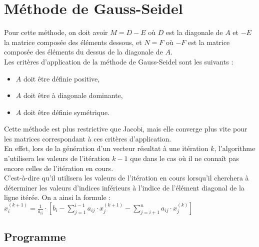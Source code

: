 \documentclass{report}
\begin{document}
  	\section{Méthode de Gauss-Seidel}
  	Pour cette méthode, on doit avoir $M=D-E$ où $D$ est la diagonale de $A$ et $-E$ la matrice composée des éléments dessous, et $N=F$ où $-F$ est la matrice composée des éléments du dessus de la diagonale de $A$.\\
      Les critères d'application de la méthode de Gauss-Seidel sont les suivants :
      \begin{itemize}
        \item{$A$ doit être définie positive,}
        \item{$A$ doit être à diagonale dominante,}
        \item{$A$ doit être définie symétrique.}
      \end{itemize}
      Cette méthode est plus restrictive que Jacobi, mais elle converge plus vite pour les matrices correspondant à ces critères d'application.\\
      
      En effet, lors de la génération d'un vecteur résultat à une itération $k$, l'algorithme n'utilisera les valeurs de l'itération $k-1$ que dans le cas où il ne connaît pas encore celles de l'itération en cours. \\
      
      C'est-à-dire qu'il utilisera les valeurs de l'itération en cours lorsqu'il cherchera à déterminer les valeurs d'indices inférieurs à l'indice de l'élément diagonal de la ligne itérée.
      On a ainsi la formule : 
      \newline
      $x_{i}^{(k+1)} = \frac{1}{a_{ii}} \cdot \left [ b_{i} - \sum_{j=1}^{i-1} a_{ij} \cdot x_{j}^{(k+1)} - \sum_{j=i+1}^{n} a_{ij} \cdot x_{j}^{(k)} \right ] $
      \newline
  	  \subsection{Programme}
        
      \newpage
\end{document}
